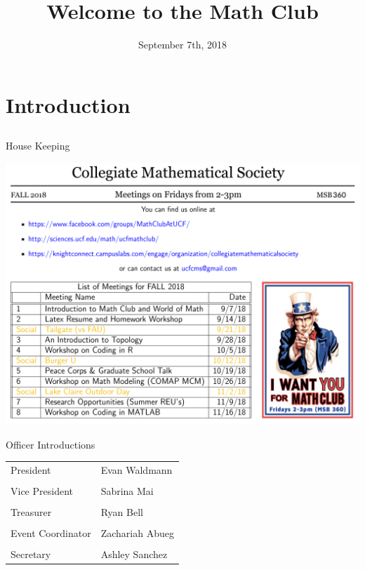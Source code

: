 \documentclass[xcolor=dvipsnames]{beamer}
\title[UCF Math Club Meeting 1]{Welcome to the Math Club}
\author{}
\institute{University of Central Florida}
\date{\scriptsize{September 7th, 2018}}
\begin{document}
\begin{frame}
  \titlepage
  \vfill
\end{frame}

\section{Introduction}
\subsection{}
\begin{frame}{House Keeping}

\centering \includegraphics[width=.8\linewidth]{CMSminusparagraph.png}

\end{frame}

\begin{frame}{Officer Introductions}
\begin{center}

\begin{tabular}{p{4cm} p{4cm} }
    President & Evan Waldmann \\ \\ 
    Vice President & Sabrina Mai \\ \\
   Treasurer & Ryan Bell \\\\
   Event Coordinator & Zachariah Abueg \\\\
   Secretary & Ashley Sanchez \\
\end{tabular}
\end{center}
\end{frame}
\end{document}

